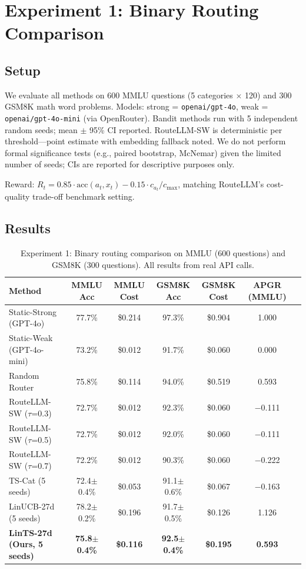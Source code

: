 \section{Experiment 1: Binary Routing Comparison}
\label{sec:exp1}

\subsection{Setup}

We evaluate all methods on 600 MMLU questions (5 categories $\times$ 120) and 300 GSM8K math word problems. Models: strong = \texttt{openai/gpt-4o}, weak = \texttt{openai/gpt-4o-mini} (via OpenRouter). Bandit methods run with 5 independent random seeds; mean $\pm$ 95\% CI reported. RouteLLM-SW is deterministic per threshold\mbox{---}point estimate with embedding fallback noted. We do not perform formal significance tests (e.g., paired bootstrap, McNemar) given the limited number of seeds; CIs are reported for descriptive purposes only.

Reward: $R_t = 0.85 \cdot \text{acc}(a_t, x_t) - 0.15 \cdot c_{a_t}/c_{\max}$, matching RouteLLM's cost-quality trade-off benchmark setting.

\subsection{Results}

\begin{table}[h]
\centering
\caption{Experiment 1: Binary routing comparison on MMLU (600 questions) and GSM8K (300 questions). All results from real API calls.}
\begin{tabular}{lcccccc}
\toprule
Method & MMLU Acc & MMLU Cost & GSM8K Acc & GSM8K Cost & APGR (MMLU) \\
\midrule
Static-Strong (GPT-4o)    & 77.7\%          & \$0.214  & 97.3\%          & \$0.904  & 1.000 \\
Static-Weak (GPT-4o-mini) & 73.2\%          & \$0.012  & 91.7\%          & \$0.060  & 0.000 \\
Random Router             & 75.8\%          & \$0.114  & 94.0\%          & \$0.519  & 0.593 \\
RouteLLM-SW ($\tau$=0.3)  & 72.7\%          & \$0.012  & 92.3\%          & \$0.060  & $-$0.111 \\
RouteLLM-SW ($\tau$=0.5)  & 72.7\%          & \$0.012  & 92.0\%          & \$0.060  & $-$0.111 \\
RouteLLM-SW ($\tau$=0.7)  & 72.2\%          & \$0.012  & 90.3\%          & \$0.060  & $-$0.222 \\
TS-Cat (5 seeds)          & 72.4$\pm$0.4\%  & \$0.053  & 91.1$\pm$0.6\%  & \$0.067  & $-$0.163 \\
LinUCB-27d (5 seeds)      & 78.2$\pm$0.2\%  & \$0.196  & 91.7$\pm$0.5\%  & \$0.126  & 1.126 \\
\textbf{LinTS-27d (Ours, 5 seeds)} & \textbf{75.8$\pm$0.4\%} & \textbf{\$0.116} & \textbf{92.5$\pm$0.4\%} & \textbf{\$0.195} & \textbf{0.593} \\
\bottomrule
\end{tabular}
\end{table}

